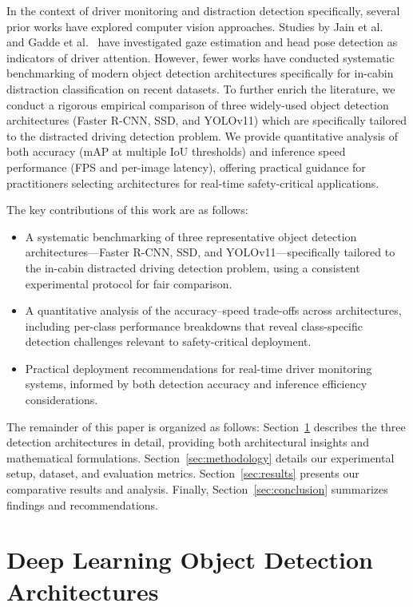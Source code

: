 \documentclass[conference]{IEEEtran}
\newcommand{\rev}[1]{{\color{blue}#1}} %
\begin{document}
In the context of driver monitoring and distraction detection specifically, several prior works have explored computer vision approaches. Studies by Jain et al.~\cite{jain2016} and Gadde et al.~\cite{gadde2016} have investigated gaze estimation and head pose detection as indicators of driver attention. However, fewer works have conducted systematic benchmarking of modern object detection architectures specifically for in-cabin distraction classification on recent datasets. To further enrich the literature, we conduct a rigorous empirical comparison of three widely-used object detection architectures (Faster R-CNN, SSD, and YOLOv11) which are specifically tailored to the distracted driving detection problem. We provide quantitative analysis of both accuracy (mAP at multiple IoU thresholds) and inference speed performance (FPS and per-image latency), offering practical guidance for practitioners selecting architectures for real-time safety-critical applications.

\rev{The key contributions of this work are as follows:
\begin{itemize}
\item A systematic benchmarking of three representative object detection architectures---Faster R-CNN, SSD, and YOLOv11---specifically tailored to the in-cabin distracted driving detection problem, using a consistent experimental protocol for fair comparison.
\item A quantitative analysis of the accuracy--speed trade-offs across architectures, including per-class performance breakdowns that reveal class-specific detection challenges relevant to safety-critical deployment.
\item Practical deployment recommendations for real-time driver monitoring systems, informed by both detection accuracy and inference efficiency considerations.
\end{itemize}}

The remainder of this paper is organized as follows: Section~\ref{sec:methods} describes the three detection architectures in detail, providing both architectural insights and mathematical formulations. Section~\ref{sec:methodology} details our experimental setup, dataset, and evaluation metrics. Section~\ref{sec:results} presents our comparative results and analysis. Finally, Section~\ref{sec:conclusion} summarizes findings and recommendations.

\section{Deep Learning Object Detection Architectures}
\label{sec:methods}
\end{document}
